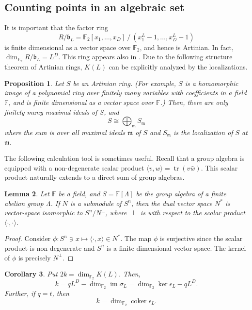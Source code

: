 \documentclass[letterpaper,12pt]{amsart}
\newtheorem{lem}{Lemma}[section]
\newtheorem{cor}[lem]{Corollary}
\newtheorem{prop}[lem]{Proposition}
\theoremstyle{definition} \newtheorem{defn}{Definition}
\theoremstyle{definition} \newtheorem{rem}{Remark}
\theoremstyle{definition} \newtheorem{example}{Example}
\newcommand{\tr}{\mathop{\mathrm{tr}}}
\newcommand{\im}{\mathop{\mathrm{im}}}
\newcommand{\coker}{\mathop{\mathrm{coker}}}
\newcommand{\FF}{\mathbb{F}}
\newcommand{\mm}{\mathfrak{m}}
\newcommand{\bb}{\mathfrak{b}}
\begin{document}
\subsection{Counting points in an algebraic set}
It is important that the factor ring
\[
 R/\bb_L = \FF_2 [x_1, \ldots, x_D]~/~(x^L_1 -1,\ldots,x^L_D -1)
\]
is finite dimensional as a vector space over $\FF_2$,
and hence is Artinian. In fact, $\dim_{\FF_2} R/\bb_L = L^D$.
This ring appears also in \cite{GueneriOezbudak2008}.
Due to the following structure theorem of Artinian rings,
$K(L)$ can be explicitly analyzed by the localizations.
\begin{prop}
\cite[Chapter~8]{AtiyahMacDonald}\cite[Section~2.4]{Eisenbud}
Let $S$ be an Artinian ring.
(For example, $S$ is a homomorphic image of a polynomial ring 
over finitely many variables with coefficients in a field $\FF$,
and is finite dimensional as a vector space over $\FF$.)
Then, there are only finitely many maximal ideals of $S$, and
\[
 S \cong \bigoplus_\mm S_\mm
\]
where the sum is over all maximal ideals $\mm$ of $S$ and $S_\mm$ is the localization of $S$ at $\mm$. 
\label{prop:Artin-ring}
\end{prop}
The following calculation tool is sometimes useful.
Recall that a group algebra is equipped with a non-degenerate 
scalar product $\langle v,w \rangle = \tr (v \bar w)$.
This scalar product naturally extends to a direct sum of group algebras.
\begin{lem}
Let $\FF$ be a field,
and $S = \FF[\Lambda]$ be the group algebra of a finite abelian group $\Lambda$.
If $N$ is a submodule of $S^n$, then the dual vector space $N^*$
is vector-space isomorphic to $S^n / N^\perp$,
where $\perp$ is with respect to the scalar product $\langle \cdot , \cdot \rangle$.
\end{lem}
\begin{proof}
Consider $\phi : S^n \ni x \mapsto \langle \cdot, x \rangle \in N^*$.
The map $\phi$ is surjective since the scalar product is non-degenerate
and $S^n$ is a finite dimensional vector space.
The kernel of $\phi$ is precisely $N^\perp$.
\end{proof}
\begin{cor}
Put $2k = \dim_{\FF_2} K(L)$. Then,
\[
 k = qL^D - \dim_{\FF_2} \im \sigma_L = \dim_{\FF_2} \ker \epsilon_L - qL^D.
\]
Further, if $q=t$, then
\[
 k = \dim_{\FF_2} \coker \epsilon_L .
\]
\label{cor:k-formulas}
\end{cor}
\end{document}
